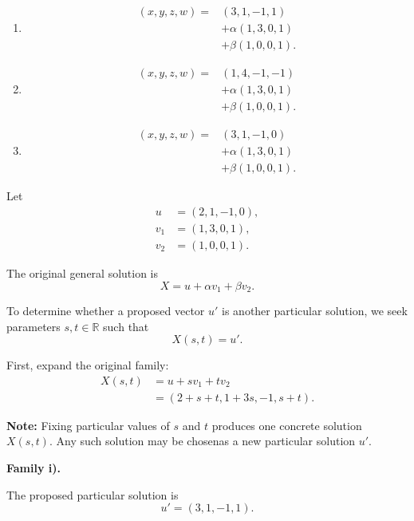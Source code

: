 \begin{enumerate}[label=\alph*)]
\begin{enumerate}[label=\roman*)]

\item
$$
\begin{aligned}
(x,y,z,w)
={}&(3,1,-1,1)\\
&+\alpha(1,3,0,1)\\
&+\beta(1,0,0,1).
\end{aligned}
$$

\item
$$
\begin{aligned}
(x,y,z,w)
={}&(1,4,-1,-1)\\
&+\alpha(1,3,0,1)\\
&+\beta(1,0,0,1).
\end{aligned}
$$

\item
$$
\begin{aligned}
(x,y,z,w)
={}&(3,1,-1,0)\\
&+\alpha(1,3,0,1)\\
&+\beta(1,0,0,1).
\end{aligned}
$$

\end{enumerate}

\begin{answer}
    Let
    $$
    \begin{aligned}
    u&=(2,1,-1,0),\\
    v_1&=(1,3,0,1),\\
    v_2&=(1,0,0,1).
    \end{aligned}
    $$

    The original general solution is
    $$
    X=u+\alpha v_1+\beta v_2.
    $$

    To determine whether a proposed vector $u'$ is another particular
    solution, we seek parameters $s,t\in\mathbb{R}$ such that
    $$
    X(s,t)=u'.
    $$

    First, expand the original family:
    $$
    \begin{aligned}
    X(s,t)
    &=u+sv_1+tv_2\\
    &=(2+s+t,1+3s,-1,s+t).
    \end{aligned}
    $$

    {\color{red}
    \textbf{Note:} Fixing particular values of $s$ and $t$ produces one concrete solution $X(s,t)$.
    Any such solution may be chosenas a new particular solution $u'$.}

    \textbf{Family i).}

    The proposed particular solution is
    $$
    u'=(3,1,-1,1).
    $$


\end{answer}
\end{enumerate}
